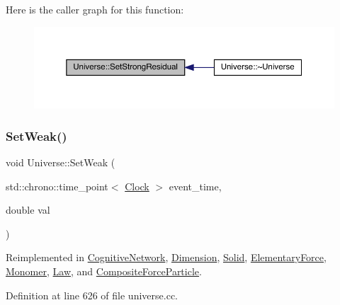 Here is the caller graph for this function\+:
\nopagebreak
\begin{figure}[H]
\begin{center}
\leavevmode
\includegraphics[width=350pt]{class_universe_a1b2d6197ddf3d613cc30bd04d22ed8b7_icgraph}
\end{center}
\end{figure}
\mbox{\label{class_universe_a0f5cd04081b41ee931c0557dc397f6fb}} 
\subsubsection{\texorpdfstring{Set\+Weak()}{SetWeak()}}
{\footnotesize\ttfamily void Universe\+::\+Set\+Weak (\begin{DoxyParamCaption}\item[{std\+::chrono\+::time\+\_\+point$<$ \hyperlink{universe_8h_a0ef8d951d1ca5ab3cfaf7ab4c7a6fd80}{Clock} $>$}]{event\+\_\+time,  }\item[{double}]{val }\end{DoxyParamCaption})\hspace{0.3cm}{\ttfamily [virtual]}}



Reimplemented in \hyperlink{class_cognitive_network_ab39c9eed50da6d3630c4498ae64b804e}{Cognitive\+Network}, \hyperlink{class_dimension_a157cfa28dd6bc5518d622d01445ca827}{Dimension}, \hyperlink{class_solid_aa28e0f7e4de2fc0c1e28d385214296bf}{Solid}, \hyperlink{class_elementary_force_a093cdf0810e95f1d973bd9dc88c6788b}{Elementary\+Force}, \hyperlink{class_monomer_ad4fe1db33f493575281e1a2fb35004ca}{Monomer}, \hyperlink{class_law_a1009b4e0bc0b91f41d48dc137529e97b}{Law}, and \hyperlink{class_composite_force_particle_a7899a6efda98b062051e37c25c214e2a}{Composite\+Force\+Particle}.



Definition at line 626 of file universe.\+cc.

